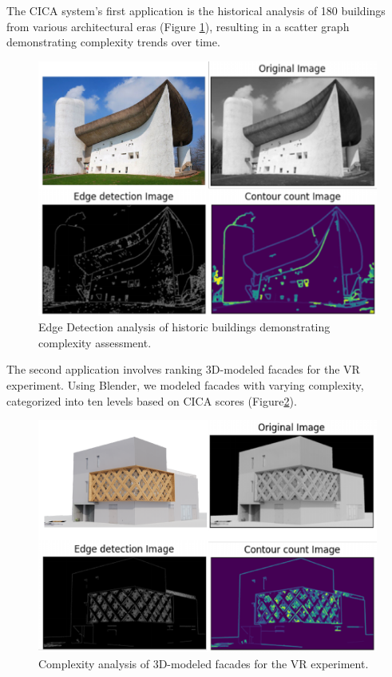 The CICA system's first application is the historical analysis of 180 buildings from various architectural eras (Figure \ref{fig:ComplexityPlotHistory}), resulting in a scatter graph demonstrating complexity trends over time.

\begin{figure}[htb]
\centering
\includegraphics[width= \linewidth]{Images/ComplexityPlotHistoryCICA}
\caption{Edge Detection analysis of historic buildings demonstrating complexity assessment.}
\label{fig:ComplexityPlotHistory}
\end{figure}

The second application involves ranking 3D-modeled facades for the VR experiment.
Using Blender, we modeled facades with varying complexity, categorized into ten levels based on CICA scores (Figure\ref{fig:ComplexityPlotRenderCICA}).

\begin{figure}[htb]
\centering
\includegraphics[width= \linewidth]{Images/ComplexitPlotRenderCICA}
\caption{Complexity analysis of 3D-modeled facades for the VR experiment.}
\label{fig:ComplexityPlotRenderCICA}
\end{figure}

